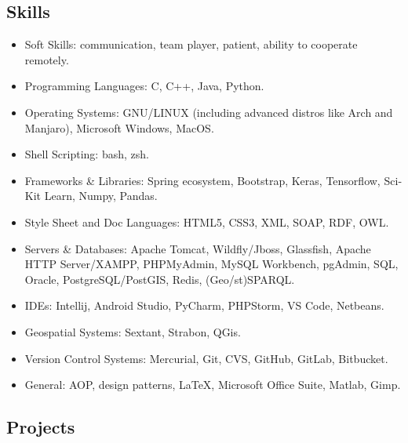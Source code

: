 \documentclass[a4paper,oneside,10pt]{article}
\begin{document}
\subsection*{Skills}

\begin{itemize}

\item Soft Skills: communication, team player, patient, ability to cooperate remotely.

\item Programming Languages: \textlatin{C, C++, Java, Python}.

\item Operating Systems: \textlatin{GNU/LINUX (including advanced distros like Arch and Manjaro), Microsoft Windows, MacOS}.

\item Shell Scripting: \textlatin{bash, zsh}.

\item Frameworks \& Libraries: \textlatin{Spring ecosystem, Bootstrap, Keras, Tensorflow, SciKit Learn, Numpy, Pandas}.

\item Style Sheet and Doc Languages: \textlatin{HTML5, CSS3, XML, SOAP, RDF, OWL}.

\item Servers \& Databases: \textlatin{Apache Tomcat, Wildfly/Jboss, Glassfish, Apache HTTP Server/XAMPP, PHPMyAdmin, MySQL Workbench, pgAdmin, SQL, Oracle, PostgreSQL/PostGIS, Redis, (Geo/st)SPARQL}.

\item IDEs: \textlatin{Intellij, Android Studio, PyCharm, PHPStorm, VS Code, Netbeans}.

\item Geospatial Systems: \textlatin{Sextant, Strabon, QGis}.

\item Version Control Systems: \textlatin{Mercurial, Git, CVS, GitHub, GitLab, Bitbucket}.

\item General: \textlatin{AOP, design patterns, \LaTeX, Microsoft Office Suite, Matlab, Gimp}.

\end{itemize}

\subsection*{Projects}
\end{document}
